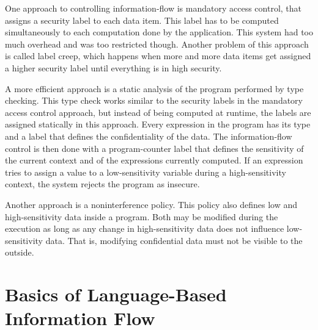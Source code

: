 \documentclass[acmlarge]{acmart}
\begin{document}
One approach to controlling information-flow is mandatory access control, that assigns a security label to each data item. This label has to be computed simultaneously to each computation done by the application. This system had too much overhead and was too restricted though. Another problem of this approach is called label creep, which happens when more and more data items get assigned a higher security label until everything is in high security.

A more efficient approach is a static analysis of the program performed by type checking. This type check works similar to the security labels in the mandatory access control approach, but instead of being computed at runtime, the labels are assigned statically in this approach. Every expression in the program has its type and a label that defines the confidentiality of the data. The information-flow control is then done with a program-counter label that defines the sensitivity of the current context and of the expressions currently computed. If an expression tries to assign a value to a low-sensitivity variable during a high-sensitivity context, the system rejects the program as insecure.

Another approach is a noninterference policy. This policy also defines low and high-sensitivity data inside a program. Both may be modified during the execution as long as any change in high-sensitivity data does not influence low-sensitivity data. That is, modifying confidential data must not be visible to the outside.

\section{Basics of Language-Based Information Flow}





\end{document}
